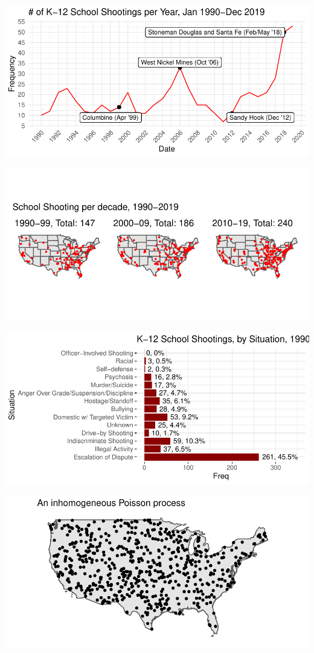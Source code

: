\documentclass[
  12pt,
]{article}
\begin{document}
\includegraphics{JStevenRaquel_STATS295_Final_files/figure-latex/ts-plot-1990-2019-1.pdf}

\includegraphics{JStevenRaquel_STATS295_Final_files/figure-latex/plot-point-patterns-1.pdf}

\includegraphics{JStevenRaquel_STATS295_Final_files/figure-latex/plot-situation-1.pdf}

\includegraphics[height=0.75\textheight]{JStevenRaquel_STATS295_Final_files/figure-latex/plot-simulate-ppm-1}
\end{document}
